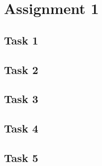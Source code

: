 \documentclass[11pt,titlepage]{report}
\begin{document}
\chapter{Assignment 1}
\section{Task 1}

\section{Task 2}

\section{Task 3}

\section{Task 4}

\section{Task 5}
\end{document}
